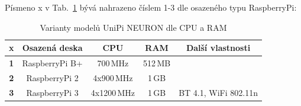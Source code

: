 \begin{table}[!ht]
\caption{Porovnání modelů UniPi NEURON dle I/O \cite{UniPiBoard2}}
\label{TableUnipiIO}
	\begin{center}
	\end{center}
\end{table}

Písmeno x v Tab.~\ref{TableUnipiVar} bývá nahrazeno číslem 1-3 dle osazeného typu RaspberryPi:

\begin{table}[!ht]
\caption{Varianty modelů UniPi NEURON dle CPU a RAM \cite{UniPiBoard2}}
\label{TableUnipiVar}
	\begin{center}
\begin{tabular}{|c|c|c|c|c|}
\hline
x & \textbf{Osazená deska} & \textbf{CPU} & \textbf{RAM} & \textbf{Další vlastnosti} \\ \hline
\textbf{1} & RaspberryPi B+ & 700\,MHz & 512\,MB &  \\ \hline
\textbf{2} & RaspberryPi 2 & 4x900\,MHz & 1\,GB &  \\ \hline
\textbf{3} & RaspberryPi 3 & 4x1200\,MHz & 1\,GB & BT 4.1, WiFi 802.11n \\ \hline
\end{tabular}
	\end{center}
\end{table}

